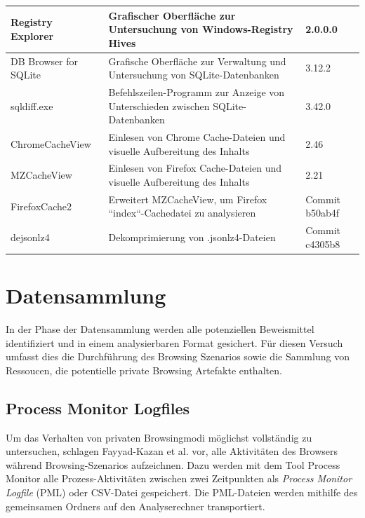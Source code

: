 \begin{table}[h!]
{\begin{tabular}{|l|l|l|}
Registry Explorer                       & Grafischer Oberfläche zur Untersuchung von Windows-Registry Hives                & 2.0.0.0                               \\ \hline
DB Browser for SQLite                   & Grafische Oberfläche zur Verwaltung und Untersuchung von SQLite-Datenbanken      & 3.12.2                                \\ \hline
sqldiff.exe                             & Befehlszeilen-Programm zur Anzeige von Unterschieden zwischen SQLite-Datenbanken & 3.42.0                                \\ \hline
ChromeCacheView                         & Einlesen von Chrome Cache-Dateien und visuelle Aufbereitung des Inhalts          & 2.46                                  \\ \hline
MZCacheView                             & Einlesen von Firefox Cache-Dateien und visuelle Aufbereitung des Inhalts         & 2.21                                  \\ \hline
FirefoxCache2                           & Erweitert MZCacheView, um Firefox ``index``-Cachedatei zu analysieren              & Commit b50ab4f                        \\ \hline
dejsonlz4                               & Dekomprimierung von .jsonlz4-Dateien                                             & Commit c4305b8                        \\ \hline
\end{tabular}
}
\end{table}


\section{Datensammlung}
\label{section:methodik-datensammlung}
In der Phase der Datensammlung werden alle potenziellen Beweismittel identifiziert und in einem analysierbaren Format gesichert.\cite{Izzati.2022}
Für diesen Versuch umfasst dies die Durchführung des Browsing Szenarios sowie die Sammlung von Ressoucen, die potentielle private Browsing Artefakte enthalten.

\subsection*{Process Monitor Logfiles}
\label{subsection:methodik-datensammlung-processmonitorlogfiles}
Um das Verhalten von privaten Browsingmodi möglichst vollständig zu untersuchen, schlagen Fayyad-Kazan et al. \cite{Fayyad.2021} vor, alle Aktivitäten des Browsers während Browsing-Szenarios aufzeichnen.
Dazu werden mit dem Tool Process Monitor alle Prozess-Aktivitäten zwischen zwei Zeitpunkten als \textit{Process Monitor Logfile} (PML) oder CSV-Datei gespeichert. \cite{Fayyad.2021, Rochmadi.2017}
Die PML-Dateien werden mithilfe des gemeinsamen Ordners auf den Analyserechner transportiert.

